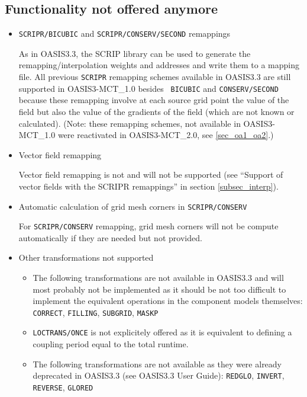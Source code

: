 \subsection{Functionality not offered anymore}
\label{sec_changes_old}

\begin{itemize}

\item {\tt SCRIPR/BICUBIC} and {\tt SCRIPR/CONSERV/SECOND} remappings

As in OASIS3.3, the SCRIP library can be used to generate the
  remapping/interpolation weights and addresses and write them to a
  mapping file. All previous {\tt SCRIPR} remapping
schemes available in OASIS3.3 are still supported in OASIS3-MCT\_1.0 besides {\tt
  BICUBIC} and {\tt CONSERV/SECOND} because these remapping involve
at each source grid point the value of the field but also the value of the
gradients of the field (which are not known or calculated). (Note: these remapping schemes, not available in OASIS3-MCT\_1.0 were reactivated in OASIS3-MCT\_2.0, see \ref{sec_oa1_oa2}.)

\item Vector field remapping

Vector field remapping is not and will not be supported (see ``Support
  of vector fields with the SCRIPR remappings'' in section \ref{subsec_interp}).

\item Automatic calculation of grid mesh corners in {\tt SCRIPR/CONSERV}

For {\tt SCRIPR/CONSERV} remapping, grid mesh corners will not
  be compute automatically if they are needed but not provided.  

\item Other transformations not supported

\begin{itemize}

\item The following transformations are not available in OASIS3.3
and will most probably not be implemented as it should be not
too difficult to implement the equivalent operations in the component
models themselves: {\tt CORRECT}, {\tt FILLING}, {\tt SUBGRID}, {\tt MASKP}

\item {\tt LOCTRANS/ONCE} is not explicitely offered as it is equivalent to
defining a coupling period equal to the total runtime.

\item The following transformations are not available as they were already
deprecated in OASIS3.3 (see OASIS3.3 User Guide): {\tt REDGLO}, {\tt INVERT},
{\tt REVERSE}, {\tt GLORED}


\end{itemize}
\end{itemize}
